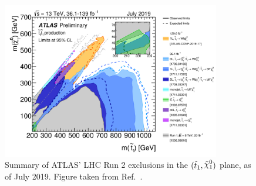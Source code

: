 \begin{figure}[!htb]
    \begin{center}
        \includegraphics[width=0.85\textwidth]{figures/conclusion/ATLAS_SUSY_Stop_tLSP}
        \caption{
            Summary of ATLAS' LHC Run 2 exclusions in the $(\stopone, \ninoone)$ plane,
            as of July 2019.
            Figure taken from Ref.~\cite{SUSYRun2Summary}.
        }
        \label{fig:run2_stop_summary}
    \end{center}
\end{figure}

%
%

